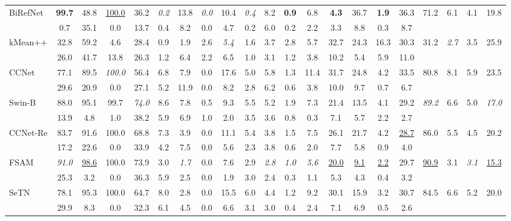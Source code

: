 \begin{table}[!htb]
\begin{tabular}{lcccccccccccccccccccc}
\addlinespace
BiRefNet & \textbf{99.7} & 48.8 & \underline{100.0} & 36.2 & \textit{0.2} & 13.8 & \textit{0.0} & 10.4 & \textit{0.4} & 8.2 & \textbf{0.9} & 6.8 & \textbf{4.3} & 36.7 & \textbf{1.9} & 36.3 & 71.2 & 6.1 & 4.1 & 19.8 \\
 & 0.7 & 35.1 & 0.0 & 13.7 & 0.4 & 8.2 & 0.0 & 4.7 & 0.2 & 6.0 & 0.2 & 2.2 & 3.3 & 8.8 & 0.3 & 8.7 &  &  &  &  \\
\addlinespace
kMean++ & 32.8 & 59.2 & 4.6 & 28.4 & 0.9 & 1.9 & 2.6 & \textit{5.4} & 1.6 & 3.7 & 2.8 & 5.7 & 32.7 & 24.3 & 16.3 & 30.3 & 31.2 & \textit{2.7} & 3.5 & 25.9 \\
 & 26.0 & 41.7 & 13.8 & 26.3 & 1.2 & 6.4 & 2.2 & 6.5 & 1.0 & 3.1 & 1.2 & 3.8 & 10.2 & 5.4 & 5.9 & 11.0 &  &  &  &  \\
\addlinespace
CCNet & 77.1 & 89.5 & \textit{100.0} & 56.4 & 6.8 & 7.9 & 0.0 & 17.6 & 5.0 & 5.8 & 1.3 & 11.4 & 31.7 & 24.8 & 4.2 & 33.5 & 80.8 & 8.1 & 5.9 & 23.5 \\
 & 29.6 & 20.9 & 0.0 & 27.1 & 5.2 & 11.9 & 0.0 & 8.2 & 2.8 & 6.2 & 0.6 & 3.8 & 10.0 & 9.7 & 0.7 & 6.7 &  &  &  &  \\
\addlinespace
Swin-B & 88.0 & 95.1 & 99.7 & \textit{74.0} & 8.6 & 7.8 & 0.5 & 9.3 & 5.5 & 5.2 & 1.9 & 7.3 & 21.4 & 13.5 & 4.1 & 29.2 & \textit{89.2} & 6.6 & 5.0 & \textit{17.0} \\
 & 13.9 & 4.8 & 1.0 & 38.2 & 5.9 & 6.9 & 1.0 & 2.0 & 3.5 & 3.6 & 0.8 & 0.3 & 7.1 & 5.7 & 2.2 & 2.7 &  &  &  &  \\
\addlinespace
CCNet-Re & 83.7 & 91.6 & 100.0 & 68.8 & 7.3 & 3.9 & 0.0 & 11.1 & 5.4 & 3.8 & 1.5 & 7.5 & 26.1 & 21.7 & 4.2 & \underline{28.7} & 86.0 & 5.5 & 4.5 & 20.2 \\
 & 17.2 & 22.6 & 0.0 & 33.9 & 4.2 & 7.5 & 0.0 & 5.6 & 2.3 & 3.8 & 0.6 & 2.0 & 7.7 & 5.8 & 0.9 & 4.0 &  &  &  &  \\
\addlinespace
FSAM & \textit{91.0} & \underline{98.6} & 100.0 & 73.9 & 3.0 & \textit{1.7} & 0.0 & 7.6 & 2.9 & \textit{2.8} & \textit{1.0} & \textit{5.6} & \underline{20.0} & \underline{9.1} & \underline{2.2} & 29.7 & \underline{90.9} & 3.1 & \textit{3.1} & \underline{15.3} \\
 & 25.3 & 3.2 & 0.0 & 36.3 & 5.9 & 2.5 & 0.0 & 1.9 & 3.0 & 2.4 & 0.3 & 1.1 & 5.3 & 4.3 & 0.4 & 3.2 &  &  &  &  \\
\addlinespace
SeTN & 78.1 & 95.3 & 100.0 & 64.7 & 8.0 & 2.8 & 0.0 & 15.5 & 6.0 & 4.4 & 1.2 & 9.2 & 30.1 & 15.9 & 3.2 & 30.7 & 84.5 & 6.6 & 5.2 & 20.0 \\
 & 29.9 & 8.3 & 0.0 & 32.3 & 6.1 & 4.5 & 0.0 & 6.6 & 3.1 & 3.0 & 0.4 & 2.4 & 7.1 & 6.9 & 0.5 & 2.6 &  &  &  &  \\

\end{tabular}
\end{table}
